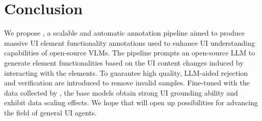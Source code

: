 \section{Conclusion}
We propose \methodname{}, a scalable and automatic annotation pipeline aimed to produce massive UI element functionality annotations used to enhance UI understanding capabilities of open-source VLMs. The pipeline prompts an open-source LLM to generate element functionalities based on the UI content changes induced by interacting with the elements. To guarantee high quality, LLM-aided rejection and verification are introduced to remove invalid samples. Fine-tuned with the data collected by \methodname{}, the base models obtain strong UI grounding ability and exhibit data scaling effects. We hope that \methodname{} will open up possibilities for advancing the field of general UI agents.